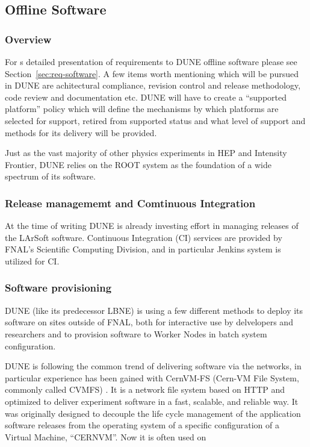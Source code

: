 \subsection{Offline Software}
\subsubsection{Overview}

For s detailed presentation of requirements to DUNE offline software please see Section~\ref{sec:req-software}.
A few items worth mentioning which will be pursued in DUNE are achitectural compliance, revision control and release methodology,
code review and documentation etc. DUNE will have to create a ``supported platform'' policy which will define the mechanisms by
which platforms are selected for support, retired from
supported status and what level of support and methods for its delivery will be provided.

Just as the vast majority of other physics experiments in HEP and Intensity Frontier, DUNE relies on the ROOT\cite{root}
system as the foundation of a wide spectrum of its software.

\subsubsection{Release managememt and Comtinuous Integration}
At the time of writing DUNE is already investing effort in managing releases of the LArSoft software. Continuous Integration (CI) services are provided
by FNAL's Scientific Computing Division, and in particular Jenkins \cite{jenkins} system is utilized for CI.

\subsubsection{Software provisioning}
DUNE (like its predecessor LBNE) is using a few different methods to deploy its software on sites outside of FNAL,
both for interactive use by delvelopers and researchers and to provision software to  Worker Nodes
in batch system configuration.

DUNE is following the common trend of delivering software via the networks, in particular experience has been gained with
CernVM-FS (Cern-VM File System, commonly called CVMFS) \cite{cvmfs}. It is a network file system based on HTTP and
optimized to deliver experiment software in a fast, scalable,
and reliable way. It was originally designed to decouple the life cycle management of the application software releases
from the operating system of a specific configuration of a Virtual Machine, ``CERNVM''. Now it is often used on